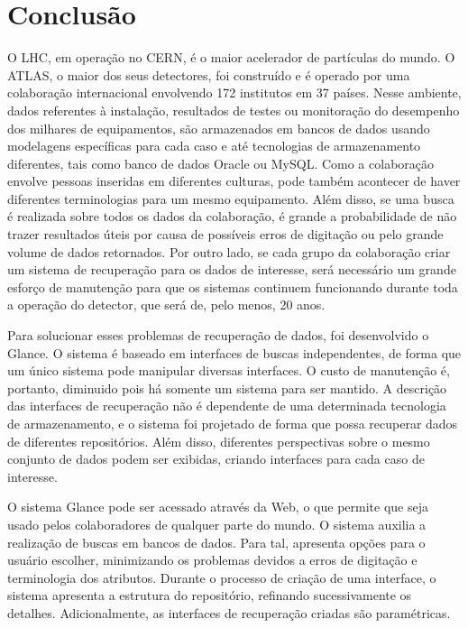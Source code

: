 \chapter{Conclusão}

O LHC, em operação no CERN, é o maior acelerador de partículas do mundo. O
ATLAS, o maior dos seus detectores, foi construído e é operado por uma
colaboração internacional envolvendo 172 institutos em 37 países.  Nesse
ambiente, dados referentes à instalação, resultados de testes ou monitoração
do desempenho dos milhares de equipamentos, são armazenados em bancos de dados
usando modelagens específicas para cada caso e até tecnologias de armazenamento
diferentes, tais como banco de dados Oracle ou MySQL.  Como a colaboração
envolve pessoas inseridas em diferentes culturas, pode também acontecer de haver
diferentes terminologias para um mesmo equipamento.  Além disso, se uma busca
é realizada sobre todos os dados da colaboração, é grande a probabilidade de não
trazer resultados úteis por causa de possíveis erros de digitação ou pelo grande
volume de dados retornados.  Por outro lado, se cada grupo da colaboração criar
um sistema de recuperação para os dados de interesse, será necessário um grande
esforço de manutenção para que os sistemas continuem funcionando durante toda a
operação do detector, que será de, pelo menos, 20 anos.

Para solucionar esses problemas de recuperação de dados, foi desenvolvido o
Glance. O sistema é baseado em interfaces de buscas independentes, de forma que
um único sistema pode manipular diversas interfaces.  O custo de manutenção é,
portanto,  diminuido pois há somente um sistema para ser mantido.  A descrição
das interfaces de recuperação não é dependente de uma determinada tecnologia de
armazenamento, e o sistema foi projetado de forma que possa recuperar dados de
diferentes repositórios. Além disso, diferentes perspectivas sobre o mesmo
conjunto de dados podem ser exibidas, criando interfaces para cada caso de
interesse.

O sistema Glance pode ser acessado através da Web, o que permite que seja usado
pelos colaboradores de qualquer parte do mundo.
%
O sistema auxilia a realização de buscas em bancos de dados. Para tal, apresenta
opções para o usuário escolher, minimizando os problemas devidos a erros de
digitação e terminologia dos atributos. Durante o processo de criação de uma
interface, o sistema apresenta a estrutura do repositório, refinando
sucessivamente os detalhes. Adicionalmente, as interfaces de
recuperação criadas são paramétricas.

